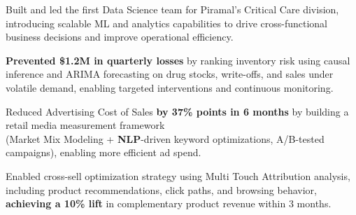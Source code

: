 \documentclass[letterpaper,11pt]{article}
\newcommand{\resumeItem}[1]{
  \item{\small{#1}}
}
\begin{document}






    \resumeItem{Built and led the first Data Science team for Piramal's Critical Care division, introducing scalable ML and analytics capabilities to drive cross-functional business decisions and improve operational efficiency.}

    
    \resumeItem{\textbf{Prevented \$1.2M in quarterly losses} by ranking inventory risk using causal inference and ARIMA forecasting on drug stocks, write-offs, and sales under volatile demand, enabling targeted interventions and continuous monitoring.}

    \resumeItem{Reduced Advertising Cost of Sales \textbf{by 37\% points in 6 months} by building a retail media measurement framework \\(Market Mix Modeling + \textbf{NLP}-driven keyword optimizations, A/B-tested campaigns), enabling more efficient ad spend.}

    \resumeItem{Enabled cross-sell optimization strategy using Multi Touch Attribution analysis, including product recommendations, click paths, and browsing behavior, \textbf{achieving a 10\% lift} in complementary product revenue within 3 months.}
\end{document}
